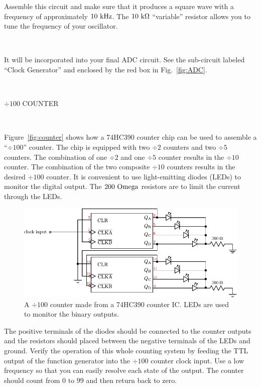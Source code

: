\documentclass[12pt,oneside,openany,letterpaper]{article}
\begin{document}
\noindent Assemble this circuit and make sure that it produces a square wave with a frequency of approximately $10\rm\ kHz$. The $10\rm\ k\Omega$ ``variable'' resistor allows you to tune the frequency of your
oscillator.

~

  It will be incorporated into your final ADC circuit. See the sub-circuit labeled ``Clock Generator'' and enclosed by the red box in Fig.~\ref{fig:ADC}.  

~

\noindent $\div 100$ COUNTER

~

\noindent Figure~\ref{fig:counter} shows how a 74HC390 counter chip can be used to assemble a ``$\div 100$'' counter.  The chip is equipped with two $\div 2$ counters and two $\div 5$ counters.  The combination of one $\div 2$ and one $\div 5$ counter results in the $\div 10$ counter.  The combination of the two composite $\div 10$ counters results in the desired $\div 100$ counter. It is convenient to use light-emitting diodes (LEDs) to monitor the digital output.  The $200\rm\ Omega$ resistors are to limit the current through the LEDs.

\begin{figure}[h!]
\centering
    \includegraphics[width=\textwidth]{figures/divideBY100.pdf}
    \caption{A $\div 100$ counter made from a 74HC390 counter IC.  LEDs are used to monitor the binary outputs.}
    \label{fig:clock}
\end{figure}

\noindent The positive terminals of the diodes should be connected to the counter outputs and the resistors should placed between the negative terminals of the LEDs and ground. Verify the operation of this whole counting system by feeding the TTL output of the function generator into the $\div 100$ counter clock input.  Use a low frequency so that you can easily resolve each state of the output. The counter should count from $0$ to $99$ and then return back to zero.
\end{document}
